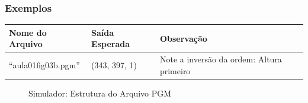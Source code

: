 \documentclass[
  portuguese,
  letterpaper,
  openany,
  oneside,
  12pt,
  a4paper]{book}
\begin{document}
\subsubsection{\texorpdfstring{
Exemplos}{ Exemplos}}\label{exemplos-7}

\begin{longtable}[]{@{}
  >{\raggedright\arraybackslash}p{}
  >{\raggedright\arraybackslash}p{}
  >{\raggedright\arraybackslash}p{}@{}}
\toprule\noalign{}
\begin{minipage}[b]{\linewidth}\raggedright
Nome do Arquivo
\end{minipage} & \begin{minipage}[b]{\linewidth}\raggedright
Saída Esperada
\end{minipage} & \begin{minipage}[b]{\linewidth}\raggedright
Observação
\end{minipage} \\
\midrule\noalign{}
\endhead
\bottomrule\noalign{}
\endlastfoot
``aula01fig03b.pgm'' & (343, 397, 1) & Note a inversão da ordem: Altura
primeiro \\
\end{longtable}

\begin{figure}


\caption{\label{fig-01-estrutura-pgm}Simulador: Estrutura do Arquivo
PGM}

\end{figure}%
\end{document}

